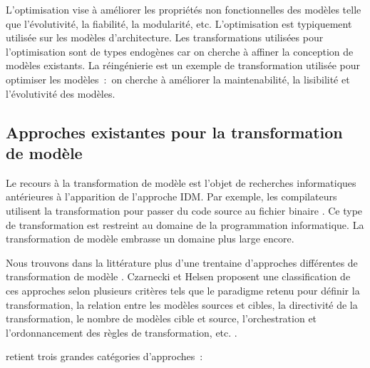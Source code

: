 L'optimisation vise à améliorer les propriétés non fonctionnelles des modèles telle que l'évolutivité, la fiabilité, la modularité, etc. L'optimisation est typiquement utilisée sur les modèles d'architecture. Les transformations utilisées pour l'optimisation sont de types endogènes car on cherche à affiner la conception de modèles existants. La réingénierie est un exemple de transformation utilisée pour optimiser les modèles~:~on cherche à améliorer la maintenabilité, la lisibilité et l'évolutivité des modèles.

\subsection{Approches existantes pour la transformation de modèle}  
Le recours à la transformation de modèle est l'objet de recherches informatiques antérieures à l'apparition de l'approche IDM. Par exemple, les compilateurs utilisent la transformation pour passer du code source au fichier binaire \cite{aho1985compilers}. Ce type de transformation est restreint au domaine de la programmation informatique. La transformation de modèle embrasse un domaine plus large encore.

Nous trouvons dans la littérature plus d'une trentaine d'approches différentes de transformation de modèle \cite{syriani2011multi}. Czarnecki et Helsen proposent une classification de ces approches selon plusieurs critères tels que le paradigme retenu pour définir la transformation, la relation entre les modèles sources et cibles, la directivité de la transformation, le nombre de modèles cible et source, l'orchestration et l'ordonnancement des règles de transformation, etc. \cite{czarnecki2006feature}.

\cite{blanc2011mda} retient trois grandes catégories d'approches~:

